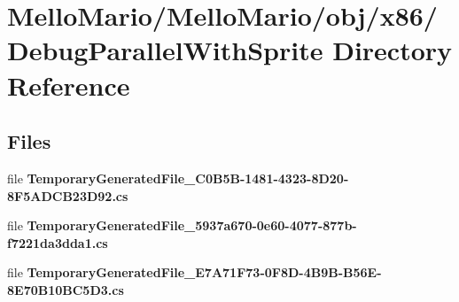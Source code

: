 \section{Mello\+Mario/\+Mello\+Mario/obj/x86/\+Debug\+Parallel\+With\+Sprite Directory Reference}
\label{dir_fe6030541537534da14128153aad1c38}
\subsection*{Files}
\begin{DoxyCompactItemize}
\item 
file \textbf{ Temporary\+Generated\+File\+\_\+C0\+B5\+B-\/1481-\/4323-\/8\+D20-\/8\+F5\+A\+D\+C\+B23\+D92.\+cs}
\item 
file \textbf{ Temporary\+Generated\+File\+\_\+5937a670-\/0e60-\/4077-\/877b-\/f7221da3dda1.\+cs}
\item 
file \textbf{ Temporary\+Generated\+File\+\_\+\+E7\+A71\+F73-\/0\+F8\+D-\/4\+B9\+B-\/\+B56\+E-\/8\+E70\+B10\+B\+C5\+D3.\+cs}
\end{DoxyCompactItemize}
